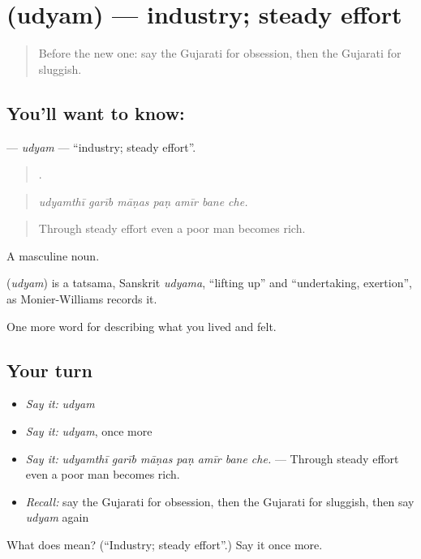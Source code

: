 \section[\texorpdfstring{\gu{ઉદ્યમ} (udyam)}{ઉદ્યમ (udyam)}]{ (udyam) — industry; steady effort}

\label{lesson:GU-C469-udyam}



\begin{quote}
Before the new one: say the Gujarati for obsession, then the Gujarati for sluggish.
\end{quote}

\subsection*{You'll want to know: }
\textbf{} — \emph{udyam} — \textquotedblleft{}industry; steady effort\textquotedblright{}.

\begin{quote}
      .
\end{quote}

\begin{quote}
\emph{udyamthī garīb māṇas paṇ amīr bane che.}
\end{quote}

\begin{quote}
Through steady effort even a poor man becomes rich.
\end{quote}

A masculine noun.

\begin{cousinweb}
\textbf{} (\emph{udyam}) is a tatsama, Sanskrit \emph{udyama}, \textquotedblleft{}lifting up\textquotedblright{} and \textquotedblleft{}undertaking, exertion\textquotedblright{}, as Monier-Williams records it.
\end{cousinweb}

\begin{grammarlens}[title={What you've built}]
One more word for describing what you lived and felt.
\end{grammarlens}

\subsection*{Your turn}
\begin{itemize}
\raggedright
  \item \emph{Say it:} \emph{udyam}
  \item \emph{Say it:} \emph{udyam}, once more
  \item \emph{Say it:} \emph{udyamthī garīb māṇas paṇ amīr bane che.} — Through steady effort even a poor man becomes rich.
  \item \emph{Recall:} say the Gujarati for obsession, then the Gujarati for sluggish, then say \emph{udyam} again
\end{itemize}

\begin{tcolorbox}[breakable,colback=teal!4,colframe=teal!35!black,title={Before you move on}]
What does  mean? (\textquotedblleft{}Industry; steady effort\textquotedblright{}.) Say it once more.
\end{tcolorbox}
